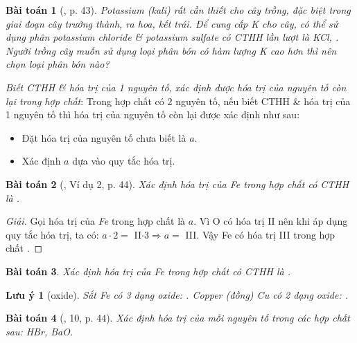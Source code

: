 \documentclass{article}
\newtheorem{baitoan}{Bài toán}
\newtheorem{luuy}{Lưu ý}
\begin{document}
\begin{baitoan}[\cite{SGK_KHTN_7_Canh_Dieu}, p. 43]
	Potassium (kali) rất cần thiết cho cây trồng, đặc biệt trong giai đoạn cây trưởng thành, ra hoa, kết trái. Để cung cấp \emph{K} cho cây, có thể sử dụng phân potassium chloride \& potassium sulfate có CTHH lần lượt là \emph{KCl, }. Người trồng cây muốn sử dụng loại phân bón có hàm lượng \emph{K} cao hơn thì nên chọn loại phân bón nào?
\end{baitoan}
\noindent{} \textit{Biết CTHH \& hóa trị của 1 nguyên tố, xác định được hóa trị của nguyên tố còn lại trong hợp chất}: Trong hợp chất có 2 nguyên tố, nếu biết CTHH \& hóa trị của 1 nguyên tố thì hóa trị của nguyên tố còn lại được xác định như sau:
\begin{itemize}
	\item Đặt hóa trị của nguyên tố chưa biết là $a$.
	\item Xác định $a$ dựa vào quy tắc hóa trị.
\end{itemize}

\begin{baitoan}[\cite{SGK_KHTN_7_Canh_Dieu}, Ví dụ 2, p. 44]
	Xác định hóa trị của \emph{Fe} trong hợp chất có CTHH là \emph{}.
\end{baitoan}

\begin{proof}[Giải]
	Gọi hóa trị của \emph{Fe} trong hợp chất là $a$. Vì O có hóa trị II nên khi áp dụng quy tắc hóa trị, ta có: $a\cdot2 =$ II$\cdot3\Rightarrow a =$ III. Vậy Fe có hóa trị III trong hợp chất .
\end{proof}

\begin{baitoan}
	Xác định hóa trị của \emph{Fe} trong hợp chất có CTHH là \emph{}.
\end{baitoan}

\begin{luuy}[oxide]
	Sắt \emph{Fe} có 3 dạng oxide: \emph{}. Copper (đồng) \emph{Cu} có 2 dạng oxide: \emph{}.
\end{luuy}

\begin{baitoan}[\cite{SGK_KHTN_7_Canh_Dieu}, 10, p. 44]
	Xác định hóa trị của mỗi nguyên tố trong các hợp chất sau: \emph{HBr, BaO}.
\end{baitoan}
\end{document}
